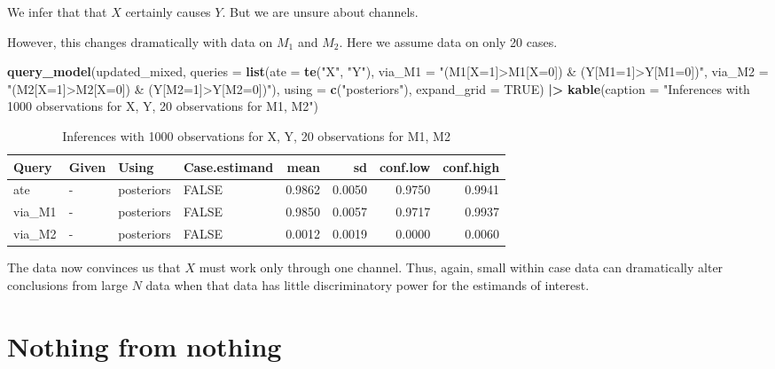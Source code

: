 \documentclass[
  12pt,
]{book}
\newenvironment{Shaded}{\begin{snugshade}}{\end{snugshade}}
\newcommand{\AttributeTok}[1]{\textcolor[rgb]{0.13,0.29,0.53}{#1}}
\newcommand{\ConstantTok}[1]{\textcolor[rgb]{0.56,0.35,0.01}{#1}}
\newcommand{\FunctionTok}[1]{\textcolor[rgb]{0.13,0.29,0.53}{\textbf{#1}}}
\newcommand{\NormalTok}[1]{#1}
\newcommand{\SpecialCharTok}[1]{\textcolor[rgb]{0.81,0.36,0.00}{\textbf{#1}}}
\newcommand{\StringTok}[1]{\textcolor[rgb]{0.31,0.60,0.02}{#1}}
\begin{document}
We infer that that \(X\) certainly causes \(Y\). But we are unsure about channels.

However, this changes dramatically with data on \(M_1\) and \(M_2\). Here we assume data on only 20 cases.

\begin{Shaded}
\begin{Highlighting}[]
\FunctionTok{query\_model}\NormalTok{(updated\_mixed, }
  \AttributeTok{queries =} \FunctionTok{list}\NormalTok{(}\AttributeTok{ate =} \FunctionTok{te}\NormalTok{(}\StringTok{"X"}\NormalTok{, }\StringTok{"Y"}\NormalTok{), }
                 \AttributeTok{via\_M1 =} \StringTok{"(M1[X=1]\textgreater{}M1[X=0]) \& (Y[M1=1]\textgreater{}Y[M1=0])"}\NormalTok{, }
                 \AttributeTok{via\_M2 =} \StringTok{"(M2[X=1]\textgreater{}M2[X=0]) \& (Y[M2=1]\textgreater{}Y[M2=0])"}\NormalTok{), }
  \AttributeTok{using =} \FunctionTok{c}\NormalTok{(}\StringTok{"posteriors"}\NormalTok{),}
  \AttributeTok{expand\_grid =} \ConstantTok{TRUE}\NormalTok{)  }\SpecialCharTok{|\textgreater{}} \FunctionTok{kable}\NormalTok{(}\AttributeTok{caption =} \StringTok{"Inferences with 1000 observations for X, Y,  20 observations for M1, M2"}\NormalTok{)}
\end{Highlighting}
\end{Shaded}

\begin{table}

\caption{\label{tab:apppaths6}Inferences with 1000 observations for X, Y,  20 observations for M1, M2}
\centering
\begin{tabular}[t]{l|l|l|l|r|r|r|r}
\hline
Query & Given & Using & Case.estimand & mean & sd & conf.low & conf.high\\
\hline
ate & - & posteriors & FALSE & 0.9862 & 0.0050 & 0.9750 & 0.9941\\
\hline
via\_M1 & - & posteriors & FALSE & 0.9850 & 0.0057 & 0.9717 & 0.9937\\
\hline
via\_M2 & - & posteriors & FALSE & 0.0012 & 0.0019 & 0.0000 & 0.0060\\
\hline
\end{tabular}
\end{table}

The data now convinces us that \(X\) must work only through one channel. Thus, again, small within case data can dramatically alter conclusions from large \(N\) data when that data has little discriminatory power for the estimands of interest.

\hypertarget{nothing-from-nothing}{%
\section{Nothing from nothing}\label{nothing-from-nothing}}
\end{document}
